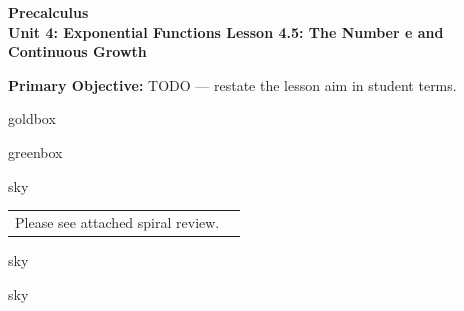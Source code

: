 \documentclass[10pt]{article}
\newcommand{\CourseName}{Precalculus}
\newcommand{\UnitNumberName}{Unit 4: Exponential Functions \quad}
\newcommand{\LessonNumberName}{Lesson 4.5: The Number e and Continuous Growth}
\begin{document}
\begin{center}
    {\Large\bfseries \CourseName \\
    {\small\bfseries \UnitNumberName \LessonNumberName}}
\end{center}

\begin{tcolorbox}[colback=sky, colframe=navy, boxrule=0.9pt, arc=2mm,
    left=2mm, right=2mm, top=1.5mm, bottom=1.5mm]
    \textbf{Primary Objective:} TODO --- restate the lesson aim in student terms.
\end{tcolorbox}

\renewcommand{\arraystretch}{1.6}
\begin{skillbox}{goldbox}
\end{skillbox}

\begin{skillbox}{greenbox}
\end{skillbox}

\begin{skillbox}{sky}
    \begin{tabularx}{\linewidth}{@{}X c@{}}
        \begin{minipage}[t]{0.55\linewidth}\vspace{0pt}
            Please see attached spiral review.  %
        \end{minipage}
        &
        \begin{minipage}[t]{0.38\linewidth}\vspace{0pt}\centering
        \end{minipage}
    \end{tabularx}
\end{skillbox}

\begin{skillbox}[Hook]{sky}
\end{skillbox}

\begin{skillbox}[Lesson]{sky}
\end{skillbox}
\end{document}
